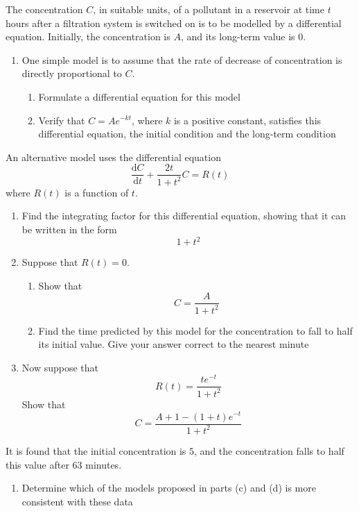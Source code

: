 \documentclass[leqno]{article}
\begin{document}
\begin{enumerate}[
  label=\textbf{\arabic*.},
  leftmargin=*,
  topsep=0pt,
  partopsep=0pt,
  parsep=0pt
]
The concentration $C$, in suitable units, of a pollutant in a reservoir at time $t$ hours after a filtration system is switched on is to be modelled by a differential equation. Initially, the concentration is $A$, and its long-term value is $0$. \\
\begin{enumerate}[label=\textbf{(\alph*)}]
  \item One simple model is to assume that the rate of decrease of concentration is directly proportional to $C$.
  \begin{enumerate}[label=(\roman*)]
    \item Formulate a differential equation for this model 
    \item Verify that $C=Ae^{-kt}$, where $k$ is a positive constant, satisfies this differential equation, the initial condition and the long-term condition  \\
  \end{enumerate}
  \end{enumerate}
  An alternative model uses the differential equation
  \[
  \frac{\mathrm{d}C}{\mathrm{d}t}+\frac{2t}{1+t^2}C=R(t)
  \]
  where $R(t)$ is a function of $t$. \\
    \begin{enumerate}[label=\textbf{(\alph*)}, resume]
  \item Find the integrating factor for this differential equation, showing that it can be written in the form
  \[
  1+t^2
  \] 
  \item Suppose that $R(t)=0$.
  \begin{enumerate}[label=(\roman*)]
    \item Show that
    \[
    C=\frac{A}{1+t^2}
    \] 
    \item Find the time predicted by this model for the concentration to fall to half its initial value. Give your answer correct to the nearest minute  \\
  \end{enumerate}
  \item Now suppose that
  \[
  R(t)=\frac{te^{-t}}{1+t^2}
  \]
  Show that
  \[
  C=\frac{A+1-(1+t)e^{-t}}{1+t^2}
  \] 
    \end{enumerate}
    
  It is found that the initial concentration is $5$, and the concentration falls to half this value after $63$ minutes. \\
  \begin{enumerate}[label=\textbf{(\alph*)}, resume]
  \item Determine which of the models proposed in parts (c) and (d) is more consistent with these data  \\
\end{enumerate}


\end{enumerate}
\end{document}
